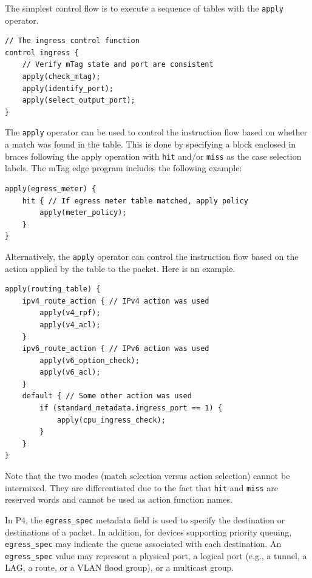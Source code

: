 \documentclass[12pt]{article}
\begin{document}
The simplest control flow is to execute a sequence of tables with the \texttt{apply} operator.

\begin{lstlisting}[keywords={},frame=single,escapechar=\@]
// The ingress control function
control ingress {
    // Verify mTag state and port are consistent
    apply(check_mtag);
    apply(identify_port);
    apply(select_output_port);
}
\end{lstlisting}


The \texttt{apply} operator can be used to control the instruction flow based on whether 
a match was found in the table. This is done by specifying a block enclosed 
in braces following the apply operation with \texttt{hit} and/or \texttt{miss} as the case 
selection labels.  The mTag edge program includes the following example:

\begin{lstlisting}[keywords={},frame=single,escapechar=\@]
apply(egress_meter) {
    hit { // If egress meter table matched, apply policy
        apply(meter_policy);
    }
}
\end{lstlisting}


Alternatively, the \texttt{apply} operator can control the instruction flow based 
on the action applied by the table to the packet. Here is an example.

\begin{lstlisting}[keywords={},frame=single,escapechar=\@]
apply(routing_table) {
    ipv4_route_action { // IPv4 action was used
        apply(v4_rpf);
        apply(v4_acl);
    }
    ipv6_route_action { // IPv6 action was used
        apply(v6_option_check);
        apply(v6_acl);
    }
    default { // Some other action was used
        if (standard_metadata.ingress_port == 1) {
            apply(cpu_ingress_check);
        }
    }
}
\end{lstlisting}


Note that the two modes (match selection versus action selection) cannot be 
intermixed. They are differentiated due to the fact that \texttt{hit} and \texttt{miss} are 
reserved words and cannot be used as action function names.


In P4, the \texttt{egress_spec} metadata field is used to specify the destination 
or destinations of a packet. In addition, for devices supporting priority 
queuing, \texttt{egress_spec} may indicate the queue associated with each destination. 
An \texttt{egress_spec} value may represent a physical port, a logical port (e.g., 
a tunnel, a LAG, a route, or a VLAN flood group), or a multicast group.
\end{document}
